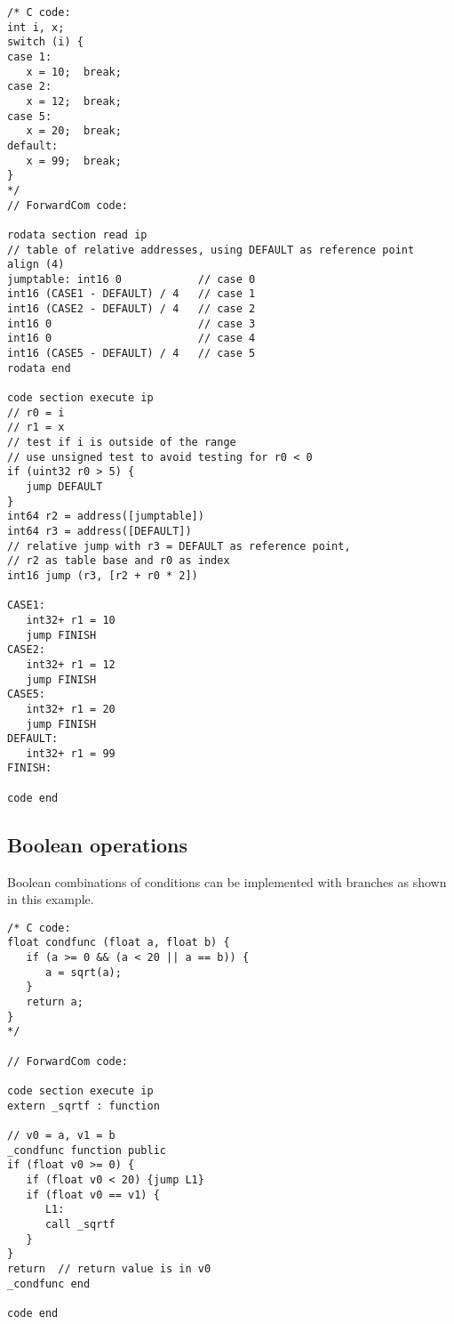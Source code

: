 \documentclass[forwardcom.tex]{subfiles}
\begin{document}
\begin{example}
\label{exampleSwitchCase}
\end{example}
\begin{lstlisting}[frame=single]
/* C code:
int i, x;
switch (i) {
case 1:
   x = 10;  break;
case 2:
   x = 12;  break;
case 5:   
   x = 20;  break;
default:
   x = 99;  break;
}
*/
// ForwardCom code:

rodata section read ip
// table of relative addresses, using DEFAULT as reference point
align (4)
jumptable: int16 0            // case 0
int16 (CASE1 - DEFAULT) / 4   // case 1
int16 (CASE2 - DEFAULT) / 4   // case 2
int16 0                       // case 3
int16 0                       // case 4
int16 (CASE5 - DEFAULT) / 4   // case 5
rodata end

code section execute ip
// r0 = i
// r1 = x
// test if i is outside of the range
// use unsigned test to avoid testing for r0 < 0
if (uint32 r0 > 5) {
   jump DEFAULT
}
int64 r2 = address([jumptable])
int64 r3 = address([DEFAULT])
// relative jump with r3 = DEFAULT as reference point,
// r2 as table base and r0 as index
int16 jump (r3, [r2 + r0 * 2])

CASE1:
   int32+ r1 = 10
   jump FINISH
CASE2:
   int32+ r1 = 12
   jump FINISH
CASE5:
   int32+ r1 = 20
   jump FINISH
DEFAULT:
   int32+ r1 = 99
FINISH:

code end
\end{lstlisting}
\vspace{4mm}


\subsection{Boolean operations} \label{BooleanOperations}
Boolean combinations of conditions can be implemented with branches as shown in this example.
\vspace{2mm}

\begin{example}
\label{exampleBooleanOperations1}
\end{example}
\begin{lstlisting}[frame=single]
/* C code:
float condfunc (float a, float b) {
   if (a >= 0 && (a < 20 || a == b)) {
      a = sqrt(a);
   }
   return a;
}
*/

// ForwardCom code:

code section execute ip
extern _sqrtf : function

// v0 = a, v1 = b
_condfunc function public
if (float v0 >= 0) {
   if (float v0 < 20) {jump L1}
   if (float v0 == v1) {
      L1:
      call _sqrtf
   }
}
return  // return value is in v0
_condfunc end

code end
\end{lstlisting}
\vspace{4mm}
\end{document}
